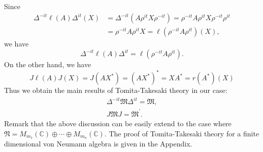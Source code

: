 Since
\begin{equation}
\begin{split}
\Delta^{-it}\ell(A)\Delta^{it}(X)&=\Delta^{-it}(A\rho^{it}X\rho^{-it})=\rho^{-it}A\rho^{it}X\rho^{-it}\rho^{it}\\
                                 &=\rho^{-it}A\rho^{it}X=\ell (\rho^{-it}A\rho^{it})(X),
\end{split}
\end{equation}
we have 
$$
\Delta^{-it}\ell(A)\Delta^{it}=\ell(\rho^{-it}A\rho^{it}).
$$
On the other hand,
we have
$$
J\ell(A)J(X)=J(AX^\ast)=(AX^\ast)^\ast=XA^\ast=r(A^\ast)(X)
$$
Thus we obtain the main results of Tomita-Takesaki theory in our case: 
\begin{equation}
\begin{split}
\Delta^{-it}\mathfrak{M}\Delta^{it}=\mathfrak{M},\\
          J\mathfrak{M}J=\mathfrak{M}^{\prime}.
\end{split}
\end{equation}
Remark that the above discussion can be easily extend to the case where 
$\mathfrak{N}=M_{m_1}(\mathbb{C})\oplus \cdots \oplus M_{m_n}(\mathbb{C})$.
The proof of Tomita-Takesaki theory for a finite dimensional von Neumann algebra is given in the Appendix.



